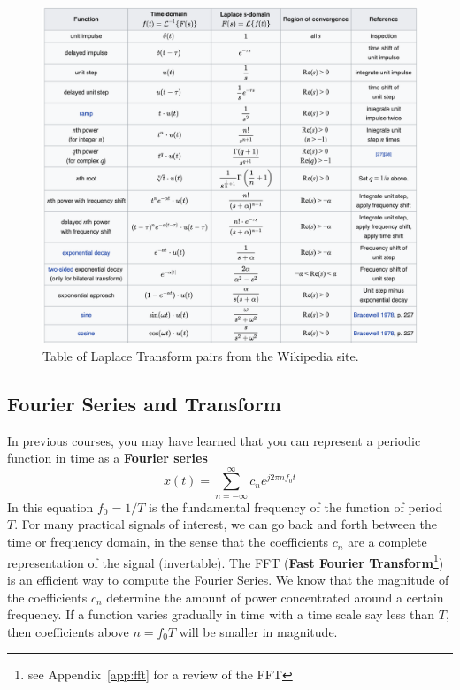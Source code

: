 \begin{figure}[H]
\centering
\includegraphics[width=.85\columnwidth]{laplace_transform.png}
\caption{Table of Laplace Transform pairs from the Wikipedia site.}
\label{fig:laplace_xform}
\end{figure}
\subsection{Fourier Series and Transform}
In previous courses, you may have learned that you can represent a periodic function in time as a \textbf{Fourier series}
    \begin{equation}
        x(t) = \sum_{n = -\infty}^{\infty} c_n e^{j 2 \pi n f_0 t}
        \label{eq:fourier_series}
    \end{equation}
In this equation $f_0 = 1/T$ is the fundamental frequency of the function of period $T$.  For many practical signals of interest, we can go back and forth between the time or frequency domain, in the sense that the coefficients $c_n$ are a complete representation of the signal (invertable).  The FFT (\textbf{Fast Fourier Transform}\footnote{see Appendix~\ref{app:fft} for a review of the FFT}) is an efficient way to compute the Fourier Series.   We know that the magnitude of the coefficients $c_n$ determine the amount of power concentrated around a certain frequency.  If a function varies gradually in time with a time scale say less than $T$, then coefficients above $n =  f_0 T $ will be smaller in magnitude.

